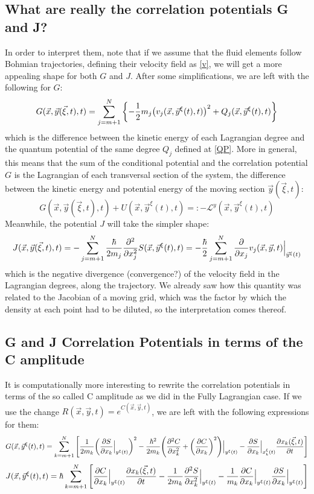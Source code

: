 \documentclass[11pt, a4paper]{article} %
\newcommand{\Lg}{\mathscr{L}}
\begin{document}
\subsection*{What are really the correlation potentials G and J?}
In order to interpret them, note that if we assume that the fluid elements follow Bohmian trajectories, defining their velocity field as \eqref{v}, we will get a more appealing shape for both $G$ and $J$. After some simplifications, we are left with the following for $G$:
\begin{equation}\label{G.Bohm}
G(\vec{x},\vec{y}(\vec{\xi},t),t)=\sum_{j=m+1}^N\qty{-\frac{1}{2}m_j\qty(v_j(\vec{x},\vec{y}^\xi(t),t))^2+Q_j(\vec{x},\vec{y}^\xi(t),t)}
\end{equation}
which is the difference between the kinetic energy of each Lagrangian degree and the quantum potential of the same degree $Q_j$ defined at \eqref{QP}. More in general, this means that the sum of the conditional potential and the correlation potential $G$ is the Lagrangian of each transversal section of the system, the difference between the kinetic energy and potential energy of the moving section $\vec{y}(\vec{\xi},t)$:
\begin{equation}
G(\vec{x},\vec{y}(\vec{\xi},t),t)+U(\vec{x},\vec{y}^\xi(t),t)=:-\Lg^y(\vec{x},\vec{y}^\xi(t),t)
\end{equation}
Meanwhile, the potential $J$ will take the simpler shape:
\begin{equation}\label{J.Bohm}
J(\vec{x},\vec{y}(\vec{\xi},t),t)=-\sum_{j=m+1}^N\frac{\hbar}{2m_j}\pdv[2]{}{x_j}S(\vec{x},\vec{y}^\xi(t),t)=-\frac{\hbar}{2}\sum_{j=m+1}^N\pdv{}{x_j}v_j(\vec{x},\vec{y},t)\Big\rvert_{\vec{y}^\xi(t)}
\end{equation}
which is the negative divergence (convergence?) of the velocity field in the Lagrangian degrees, along the trajectory. We already saw how this quantity was related to the Jacobian of a moving grid, which was the factor by which the density at each point had to be diluted, so the interpretation comes thereof.
\subsection*{G and J Correlation Potentials in terms of the C amplitude}
It is computationally more interesting to rewrite the correlation potentials in terms of the so called C amplitude as we did in the Fully Lagrangian case. If we use the change $R(\vec{x},\vec{y},t)=e^{C(\vec{x},\vec{y},t)}$, we are left with the following expressions for them:
\begin{equation}
G(\vec{x}, \vec{y}^\xi(t),t)=  \sum_{k=m+1}^N \qty[\frac{1}{2m_k} \qty(\pdv{S}{x_k}\Big\rvert_{y^\xi(t)})^2 -\frac{\hbar^2}{2m_k}\qty(\pdv[2]{C}{x_k}+\qty(\pdv{C}{x_k})^2)\Big\rvert_{y^\xi(t)} -\pdv{S}{x_k}\Big\rvert_{x_k^\xi(t)} \pdv{x_k(\vec{\xi},t)}{t} ]
\end{equation}
\begin{equation}
J(\vec{x}, \vec{y}^\xi(t),t)= \hbar\sum_{k=m+1}^N \qty[ \pdv{C}{x_k}\Big\rvert_{y^\xi(t)} \pdv{x_k(\vec{\xi},t)}{t} - \frac{1}{2m_k} \pdv[2]{S}{x_k}\Big\rvert_{y^\xi(t)}-\frac{1}{m_k}\pdv{C}{x_k}\Big\rvert_{y^\xi(t)}  \pdv{S}{x_k} \Big\rvert_{y^\xi(t)} ]
\end{equation}
\end{document}
